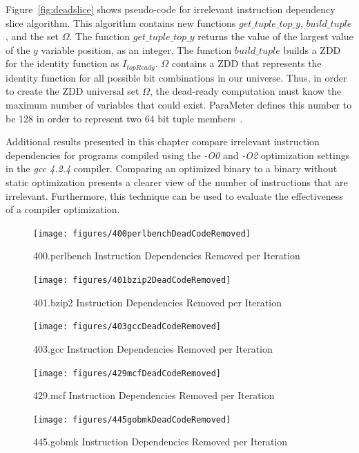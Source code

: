 \documentclass[defaultstyle,11pt]{thesis}
\begin{document}
Figure~\ref{fig:deadslice} shows pseudo-code for irrelevant
instruction dependency slice algorithm.  This algorithm contains new
functions $get\_tuple\_top\_y$, $build\_tuple$, and the set $\Omega$.
The function $get\_tuple\_top\_y$ returns the value of the largest
value of the $y$ variable position, as an integer.  The function
$build\_tuple$ builds a ZDD for the identity function as
$I_{topReady}$.  $\Omega$ contains a ZDD that represents the identity
function for all possible bit combinations in our universe.  Thus, in
order to create the ZDD universal set $\Omega$, the dead-ready
computation must know the maximum number of variables that could
exist.  ParaMeter defines this number to be 128 in order to represent
two 64 bit tuple members~\cite{price:10:cgo}.

Additional results presented in this chapter compare irrelevant
instruction dependencies for programs compiled using the \textit{-O0}
and \textit{-O2} optimization settings in the \textit{gcc 4.2.4}
compiler.  Comparing an optimized binary to a binary without static
optimization presents a clearer view of the number of instructions
that are irrelevant.  Furthermore, this technique can be used to
evaluate the effectiveness of a compiler optimization.

\begin{figure}
  \centering
  \texttt{[image: figures/400perlbenchDeadCodeRemoved]}
  \caption{400.perlbench Instruction Dependencies Removed per Iteration}
  \label{fig:400perldc}
\end{figure}

\begin{figure}
  \centering
  \texttt{[image: figures/401bzip2DeadCodeRemoved]}
  \caption{401.bzip2 Instruction Dependencies Removed per Iteration}
  \label{fig:401bzipdc}
\end{figure}

\begin{figure}
  \centering
  \texttt{[image: figures/403gccDeadCodeRemoved]}
  \caption{403.gcc Instruction Dependencies Removed per Iteration}
  \label{fig:403gccdc}
\end{figure}

\begin{figure}
  \centering
  \texttt{[image: figures/429mcfDeadCodeRemoved]}
  \caption{429.mcf Instruction Dependencies Removed per Iteration}
  \label{fig:429mcfdc}
\end{figure}

\begin{figure}
  \centering
  \texttt{[image: figures/445gobmkDeadCodeRemoved]}
  \caption{445.gobmk Instruction Dependencies Removed per Iteration}
  \label{fig:445gobmkdc}
\end{figure}
\end{document}
